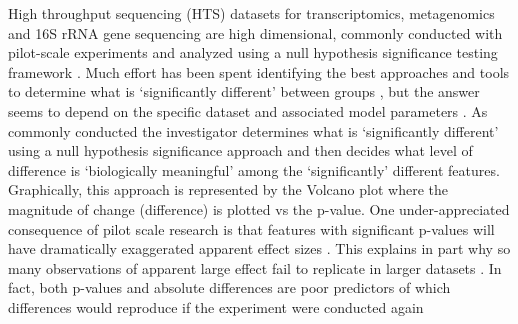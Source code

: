 High throughput sequencing (HTS) datasets for transcriptomics, metagenomics and 16S rRNA gene sequencing are high dimensional, commonly conducted with pilot-scale  experiments and analyzed using a null hypothesis significance testing framework \citep{Schurch:2016aa}. Much effort has been spent identifying the best approaches and tools to determine what is `significantly different' between groups \citep{Soneson:2013,Schurch:2016aa}, but the answer seems to depend on the specific dataset and associated model parameters \citep{Thorsen:2016aa,hawinkel2017,Weiss:2017aa}. As commonly conducted the investigator determines what is `significantly different' using a null hypothesis significance approach and then decides what level of difference is `biologically meaningful' among the `significantly' different features. Graphically, this approach is  represented by the Volcano plot \citep{Cui:2003aa} where the magnitude of change (difference) is plotted vs the p-value.  One under-appreciated consequence of pilot scale research is that features with significant p-values   will have dramatically exaggerated  apparent effect sizes \citep{Halsey:2015aa}. This explains in part why so many observations  of apparent large effect fail to replicate in larger datasets \citep{Ioannidis:2005aa}. In fact, both p-values and absolute differences are poor predictors of which differences would reproduce if the experiment were conducted again \citep{Cumming:2008aa,Halsey:2015aa}




